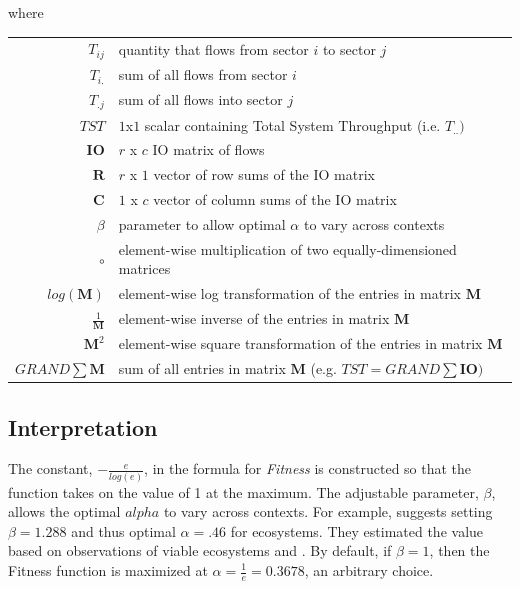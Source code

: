 \documentclass{article}
\begin{document}
where \\
\begin{tabular}{r l}
$T_{ij}$  & quantity that flows from sector $i$ to sector $j$ \\[.1in]
$T_{i.}$ & sum of all flows from sector $i$ \\
$T_{.j}$ & sum of all flows into sector $j$ \\
$TST$ & $1$x$1$ scalar containing Total System Throughput (i.e. $T_{..})$\\
$\mathbf{IO}$ & $r$ x $c$ IO matrix of flows \\
$\mathbf{R}$ &  $r$ x $1$ vector of row sums of the IO matrix\\
$\mathbf{C}$ &  $1$ x $c$ vector of column sums of the IO matrix \\
$\beta$ &  parameter to allow optimal $\alpha$ 
    to vary across contexts  \\
$\circ$ & element-wise multiplication of two equally-dimensioned
matrices\\
$log(\mathbf{M})$ & element-wise log transformation of the 
entries in matrix $\mathbf{M}$\\
$\frac{1}{\mathbf{M}}$ & element-wise inverse of the entries in 
matrix $\mathbf{M}$ \\
$\mathbf{M}^2$ & element-wise square transformation of the 
entries in matrix $\mathbf{M}$ \\
$GRAND \sum \mathbf{M}$ & sum of all entries 
in matrix $\mathbf{M}$ (e.g. $TST=GRAND\sum \mathbf{IO})$ \\


\end{tabular}


\medskip

\subsection{Interpretation}

  The constant, $-\frac{e}{log(e)}$, in the formula for \emph{Fitness} 
  is constructed so that the function takes on the value of 1 at the maximum. 
  The adjustable parameter, $\beta$, 
  allows the optimal $alpha$ to vary across contexts. For example, 
  \cite{ulanowicz_quantifying_2009} suggests setting $\beta=1.288$ and 
  thus optimal $\alpha = .46$ for ecosystems. They estimated the 
  value based on observations of viable ecosystems and . By default, if $\beta=1$, then the Fitness function 
 is maximized at $\alpha = \frac{1}{e} = 0.3678$, an arbitrary choice.
\end{document}
